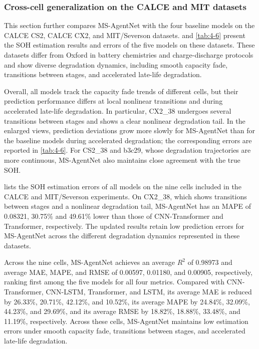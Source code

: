 \clearpage

\clearpage
\FloatBarrier

\subsubsection{Cross-cell generalization on the CALCE and MIT datasets}

This section further compares MS-AgentNet with the four baseline models on the CALCE CS2, CALCE CX2, and MIT/Severson datasets.  and \cref{tab:4-6} present the SOH estimation results and errors of the five models on these datasets. These datasets differ from Oxford in battery chemistries and charge-discharge protocols and show diverse degradation dynamics, including smooth capacity fade, transitions between stages, and accelerated late-life degradation.

Overall, all models track the capacity fade trends of different cells, but their prediction performance differs at local nonlinear transitions and during accelerated late-life degradation. In particular, CX2\_38 undergoes several transitions between stages and shows a clear nonlinear degradation tail. In the enlarged views, prediction deviations grow more slowly for MS-AgentNet than for the baseline models during accelerated degradation; the corresponding errors are reported in \cref{tab:4-6}. For CS2\_38 and b3c29, whose degradation trajectories are more continuous, MS-AgentNet also maintains close agreement with the true SOH.

 lists the SOH estimation errors of all models on the nine cells included in the CALCE and MIT/Severson experiments. On CX2\_38, which shows transitions between stages and a nonlinear degradation tail, MS-AgentNet has an MAPE of 0.08321, 30.75\% and 49.61\% lower than those of CNN-Transformer and Transformer, respectively. The updated results retain low prediction errors for MS-AgentNet across the different degradation dynamics represented in these datasets.

Across the nine cells, MS-AgentNet achieves an average $R^2$ of 0.98973 and average MAE, MAPE, and RMSE of 0.00597, 0.01180, and 0.00905, respectively, ranking first among the five models for all four metrics. Compared with CNN-Transformer, CNN-LSTM, Transformer, and LSTM, its average MAE is reduced by 26.33\%, 20.71\%, 42.12\%, and 10.52\%, its average MAPE by 24.84\%, 32.09\%, 44.23\%, and 29.69\%, and its average RMSE by 18.82\%, 18.88\%, 33.48\%, and 11.19\%, respectively. Across these cells, MS-AgentNet maintains low estimation errors under smooth capacity fade, transitions between stages, and accelerated late-life degradation.

